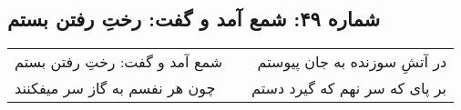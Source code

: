 \begin{center}
\section*{شماره ۴۹: شمع آمد و گفت: رختِ رفتن بستم}
\label{sec:049}
\begin{longtable}{l p{0.5cm} r}
شمع آمد و گفت: رختِ رفتن بستم
&&
در آتشِ سوزنده به جان پیوستم
\\
چون هر نفسم به گاز سر میفکنند
&&
بر پای که سر نهم که گیرد دستم
\\
\end{longtable}
\end{center}
